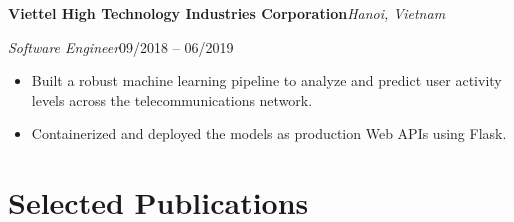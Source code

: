 \documentclass[11pt,a4paper]{article}
\newcommand{\entry}[2]{\noindent\textbf{#1}\hfill\textit{#2}\par}
\newcommand{\subentry}[2]{\noindent\textit{#1}\hfill #2\par\vspace{2pt}}
\begin{document}
\entry{Viettel High Technology Industries Corporation}{Hanoi, Vietnam}
\subentry{Software Engineer}{09/2018 -- 06/2019}
\begin{itemize}
    \item Built a robust machine learning pipeline to analyze and predict
          user activity levels across the telecommunications network.
    \item Containerized and deployed the models as production Web APIs
          using Flask.
\end{itemize}

\newpage
\section{Selected Publications}
\end{document}
